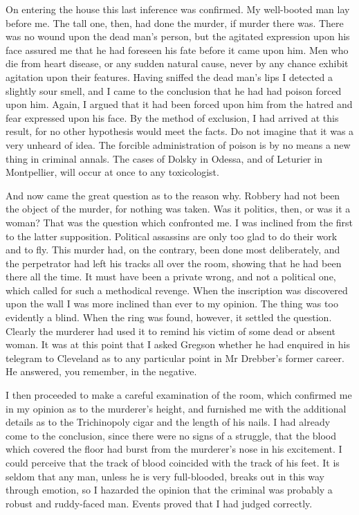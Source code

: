 On entering the house this last inference was confirmed. My well-booted man lay before me. The tall one, then, had done the murder, if murder there was. There was no wound upon the dead man's person, but the agitated expression upon his face assured me that he had foreseen his fate before it came upon him. Men who die from heart disease, or any sudden natural cause, never by any chance exhibit agitation upon their features. Having sniffed the dead man's lips I detected a slightly sour smell, and I came to the conclusion that he had had poison forced upon him. Again, I argued that it had been forced upon him from the hatred and fear expressed upon his face. By the method of exclusion, I had arrived at this result, for no other hypothesis would meet the facts. Do not imagine that it was a very unheard of idea. The forcible administration of poison is by no means a new thing in criminal annals. The cases of Dolsky in Odessa, and of Leturier in Montpellier, will occur at once to any toxicologist.

And now came the great question as to the reason why. Robbery had not been the object of the murder, for nothing was taken. Was it politics, then, or was it a woman? That was the question which confronted me. I was inclined from the first to the latter supposition. Political assassins are only too glad to do their work and to fly. This murder had, on the contrary, been done most deliberately, and the perpetrator had left his tracks all over the room, showing that he had been there all the time. It must have been a private wrong, and not a political one, which called for such a methodical revenge. When the inscription was discovered upon the wall I was more inclined than ever to my opinion. The thing was too evidently a blind. When the ring was found, however, it settled the question. Clearly the murderer had used it to remind his victim of some dead or absent woman. It was at this point that I asked Gregson whether he had enquired in his telegram to Cleveland as to any particular point in Mr Drebber's former career. He answered, you remember, in the negative.

I then proceeded to make a careful examination of the room, which confirmed me in my opinion as to the murderer's height, and furnished me with the additional details as to the Trichinopoly cigar and the length of his nails. I had already come to the conclusion, since there were no signs of a struggle, that the blood which covered the floor had burst from the murderer's nose in his excitement. I could perceive that the track of blood coincided with the track of his feet. It is seldom that any man, unless he is very full-blooded, breaks out in this way through emotion, so I hazarded the opinion that the criminal was probably a robust and ruddy-faced man. Events proved that I had judged correctly.

